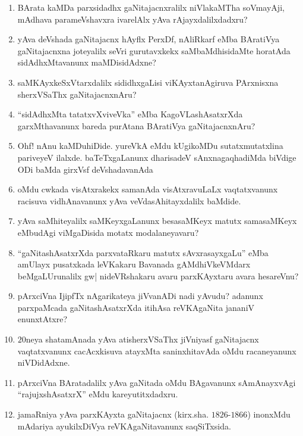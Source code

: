 \begin{enumerate}
\item BArata kaMDa parxsidadhx gaNitajacnxralilx niVlakaMTha soVmayAji, mAdhava parameVshavxra ivarelAlx yAva rAjayxdalilxdadxru?
  
\item yAva deVshada gaNitajacnx hAyflx PerxDf, nAliRkarf eMba BAratiVya gaNitajacnxna joteyalilx seVri gurutavxkekx saMbaMdhisidaMte horatAda sidAdhxMtavanunx maMDisidAdxne?
  
\item saMKAyxkeSxVtarxdalilx sididhxgaLisi viKAyxtanAgiruva PArxnisxna sherxVSaThx gaNitajacnxnAru?
  
\item ``sidAdhxMta tatatxvXviveVka'' eMba KagoVLashAsatxrXda garxMthavanunx bareda purAtana BAratiVya gaNitajacnxnAru?
  
\item Ohf! nAnu kaMDuhiDide. yureVkA eMdu kUgikoMDu sutatxmutatxlina pariveyeV ilalxde. baTeTxgaLanunx dharisadeV sAnxnagaqhadiMda  biVdige ODi baMda girxVsf deVshadavanAda
  
\item oMdu cwkada visAtxrakekx samanAda visAtxravuLaLx vaqtatxvanunx racisuva vidhAnavanunx yAva veVdasAhitayxdalilx baMdide.
  
\item yAva saMhiteyalilx saMKeyxgaLanunx besasaMKeyx matutx samasaMKeyx eMbudAgi viMgaDisida motatx modalaneyavaru?
  
\item ``gaNitashAsatxrXda parxvataRkaru matutx sAvxrasayxgaLu'' eMba amUlayx pusatxkada leVKakaru Bavanada gAMdhiVkeVMdarx beMgaLUrunalilx gw| nideVRshakaru avaru parxKAyxtaru avara hesareVnu?

\item pArxciVna IjipfTx nAgarikateya jiVvanADi nadi yAvudu? adanunx parxpaMcada gaNitashAsatxrXda itihAsa reVKAgaNita jananiV enunxtAtxre?
  
\item $20$neya shatamAnada yAva atisherxVSaThx jiVniyasf gaNitajacnx vaqtatxvanunx cacAcxkisuva atayxMta saninxhitavAda oMdu racaneyanunx niVDidAdxne.
  
\item pArxciVna BAratadalilx yAva gaNitada oMdu BAgavanunx sAmAnayxvAgi ``rajujxshAsatxrX'' eMdu kareyutitxdadxru.
  
\item jamaRniya yAva parxKAyxta gaNitajacnx (kirx.sha. $1826$-$1866$) inonxMdu mAdariya ayukilxDiVya reVKAgaNitavanunx saqSiTxsida.
  

\end{enumerate}
